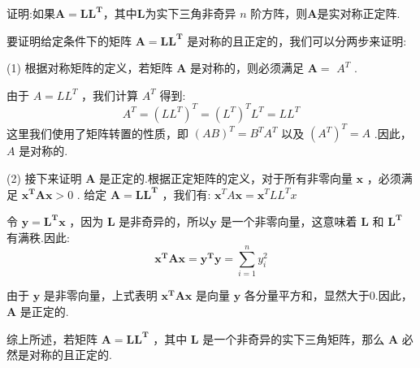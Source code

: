 \begin{tcolorbox}[breakable,
		colframe=white!10!jingga, coltitle=white!90!jingga, colback=white!95!jingga, coltext=black, colbacktitle=white!10!jingga, enhanced, fonttitle=\bfseries,fontupper=\normalsize, attach boxed title to top left={yshift=-2mm}, before skip=8pt, after skip=8pt,
		title=解答题]

证明:如果$ \boldsymbol{A}=\boldsymbol{L L}^{\boldsymbol{T}} $，其中$ \boldsymbol{L} $为实下三角非奇异 $ n $ 阶方阵，则$ \boldsymbol{A} $是实对称正定阵.
 \tcblower

要证明给定条件下的矩阵 $ \boldsymbol{A}=\boldsymbol{L} \boldsymbol{L}^{\boldsymbol{T}} $ 是对称的且正定的，我们可以分两步来证明:

(1) 根据对称矩阵的定义，若矩阵 $ \boldsymbol{A} $ 是对称的，则必须满足 $ \boldsymbol{A}= $ $ A^{T} $ .

由于 $ A=L L^{T} $ ，我们计算 $ A^{T} $ 得到:
$$
A^{T}=\left(L L^{T}\right)^{T}=\left(L^{T}\right)^{T} L^{T}=L L^{T}
$$
这里我们使用了矩阵转置的性质，即 $ (A B)^{T}=B^{T} A^{T} $ 以及 $ \left(A^{T}\right)^{T}=A $ .因此， $ A $ 是对称的.

(2) 接下来证明 $ \boldsymbol{A} $ 是正定的.根据正定矩阵的定义，对于所有非零向量 $ \boldsymbol{x} $ ，必须满足 $ \boldsymbol{x}^{\boldsymbol{T}} \boldsymbol{A x}>0 $ .
给定 $ \boldsymbol{A}=\boldsymbol{L} \boldsymbol{L}^{\boldsymbol{T}} $ ，我们有:
$ \boldsymbol{x}^{T} A \boldsymbol{x}=\boldsymbol{x}^{T} L L^{T} x $

令 $ \boldsymbol{y}=\boldsymbol{L}^{\boldsymbol{T}} \boldsymbol{x} $ ，因为 $ \boldsymbol{L} $ 是非奇异的，所以$\boldsymbol{y} $ 是一个非零向量，这意味着 $ \boldsymbol{L} $ 和 $ \boldsymbol{L}^{\boldsymbol{T}} $ 有满秩.因此:
$$
\boldsymbol{x}^{\boldsymbol{T}} \boldsymbol{A} \boldsymbol{x}=\boldsymbol{y}^{\boldsymbol{T}} \boldsymbol{y}=\sum_{i=1}^{n} y_{i}^{2}
$$

由于 $ \boldsymbol{y} $ 是非零向量，上式表明 $ \boldsymbol{x}^{\boldsymbol{T}} \boldsymbol{A} \boldsymbol{x} $ 是向量 $ \boldsymbol{y} $ 各分量平方和，显然大于0.因此， $ \boldsymbol{A} $ 是正定的.

综上所述，若矩阵 $ \boldsymbol{A}=\boldsymbol{L} \boldsymbol{L}^{\boldsymbol{T}} $ ，其中 $ \boldsymbol{L} $ 是一个非奇异的实下三角矩阵，那么 $ \boldsymbol{A} $ 必然是对称的且正定的.
\end{tcolorbox}


